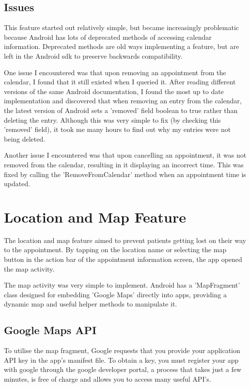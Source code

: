 \subsection{Issues}

This feature started out relatively simple, but became increasingly problematic because Android has lots of deprecated methods of accessing calendar information. Deprecated methods are old ways implementing a feature, but are left in the Android sdk to preserve backwards compatibility.

One issue I encountered was that upon removing an appointment from the calendar, I found that it still existed when I queried it. After reading different versions of the same Android documentation, I found the most up to date implementation and discovered that when removing an entry from the calendar, the latest version of Android sets a 'removed' field boolean to true rather than deleting the entry. Although this was very simple to fix (by checking this 'removed' field), it took me many hours to find out why my entries were not being deleted.

Another issue I encountered was that upon cancelling an appointment, it was not removed from the calendar, resulting in it displaying an incorrect time. This was fixed by calling the 'RemoveFromCalendar' method when an appointment time is updated.

\section{Location and Map Feature}

The location and map feature aimed to prevent patients getting lost on their way to the appointment. By tapping on the location name or selecting the map button in the action bar of the appointment information screen, the app opened the map activity.

The map activity was very simple to implement. Android has a 'MapFragment' class designed for embedding 'Google Maps' directly into apps, providing a dynamic map and useful helper methods to manipulate it. 

\subsection{Google Maps API}

To utilise the map fragment, Google requests that you provide your application API key in the app's manifest file. To obtain a key, you must register your app with google through the google developer portal, a process that takes just a few minutes, is free of charge and allows you to access many useful API's.

